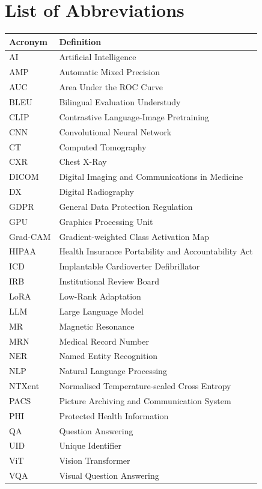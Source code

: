 \documentclass[12pt, a4paper, twoside]{report}
\begin{document}
\chapter*{List of Abbreviations}
\begin{tabular}{@{}ll}
  \toprule
  \textbf{Acronym} & \textbf{Definition} \\
  \midrule
  AI   & Artificial Intelligence \\
  AMP  & Automatic Mixed Precision \\
  AUC  & Area Under the ROC Curve \\
  BLEU & Bilingual Evaluation Understudy \\
  CLIP & Contrastive Language-Image Pretraining \\
  CNN  & Convolutional Neural Network \\
  CT   & Computed Tomography \\
  CXR  & Chest X-Ray \\
  DICOM& Digital Imaging and Communications in Medicine \\
  DX   & Digital Radiography \\
  GDPR & General Data Protection Regulation \\
  GPU  & Graphics Processing Unit \\
  Grad-CAM & Gradient-weighted Class Activation Map \\
  HIPAA& Health Insurance Portability and Accountability Act \\
  ICD  & Implantable Cardioverter Defibrillator \\
  IRB  & Institutional Review Board \\
  LoRA & Low-Rank Adaptation \\
  LLM  & Large Language Model \\
  MR   & Magnetic Resonance \\
  MRN  & Medical Record Number \\
  NER  & Named Entity Recognition \\
  NLP  & Natural Language Processing \\
  NTXent & Normalised Temperature-scaled Cross Entropy \\
  PACS & Picture Archiving and Communication System \\
  PHI  & Protected Health Information \\
  QA   & Question Answering \\
  UID  & Unique Identifier \\
  ViT  & Vision Transformer \\
  VQA  & Visual Question Answering \\
  \bottomrule
\end{tabular}
\end{document}
